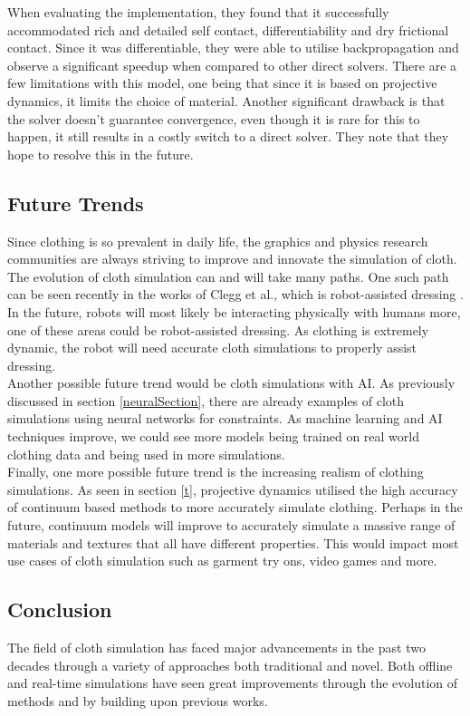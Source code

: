 \documentclass[12pt,a4paper]{article}
\begin{document}
When evaluating the implementation, they found that it successfully accommodated rich and detailed self contact, differentiability and dry frictional contact. Since it was differentiable, they were able to utilise backpropagation and observe a significant speedup when compared to other direct solvers. There are a few limitations with this model, one being that since it is based on projective dynamics, it limits the choice of material. Another significant drawback is that the solver doesn't guarantee convergence, even though it is rare for this to happen, it still results in a costly switch to a direct solver. They note that they hope to resolve this in the future.

\subsection{Future Trends}
Since clothing is so prevalent in daily life, the graphics and physics research communities are always striving to improve and innovate the simulation of cloth. The evolution of cloth simulation can and will take many paths. One such path can be seen recently in the works of Clegg et al., which is robot-assisted dressing \cite{robot}. In the future, robots will most likely be interacting physically with humans more, one of these areas could be robot-assisted dressing. As clothing is extremely dynamic, the robot will need accurate cloth simulations to properly assist dressing.
\\

Another possible future trend would be cloth simulations with AI. As previously discussed in section \ref{neuralSection}, there are already examples of cloth simulations using neural networks for constraints. As machine learning and AI techniques improve, we could see more models being trained on real world clothing data and being used in more simulations.
\\

Finally, one more possible future trend is the increasing realism of clothing simulations. As seen in section \ref{t}, projective dynamics utilised the high accuracy of continuum based methods to more accurately simulate clothing. Perhaps in the future, continuum models will improve to accurately simulate a massive range of materials and textures that all have different properties. This would impact most use cases of cloth simulation such as garment try ons, video games and more.
\subsection{Conclusion}
The field of cloth simulation has faced major advancements in the past two decades through a variety of approaches both traditional and novel. Both offline and real-time simulations have seen great improvements through the evolution of methods and by building upon previous works. 
\\
\end{document}
